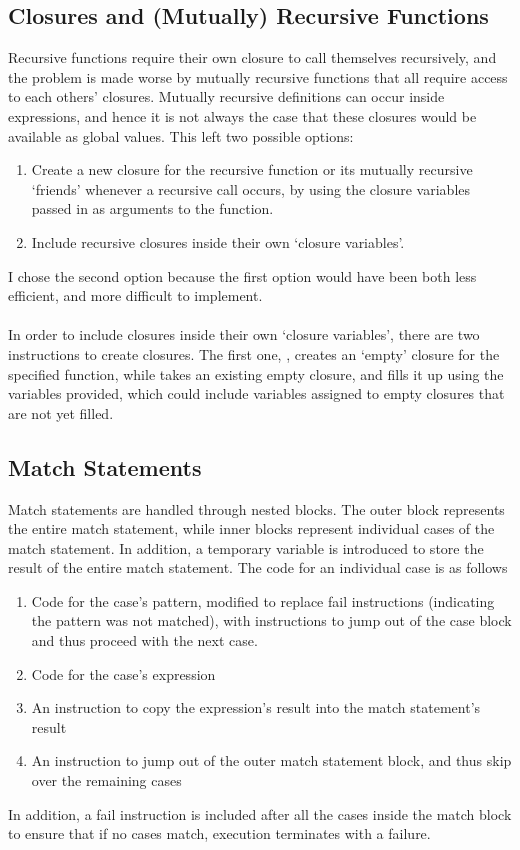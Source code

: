 \subsection{Closures and (Mutually) Recursive Functions}
Recursive functions require their own closure to call themselves recursively, and the problem is made worse by mutually recursive functions that all require access to each others' closures. Mutually recursive definitions can occur inside expressions, and hence it is not always the case that these closures would be available as global values. This left two possible options:
\begin{enumerate}
\item Create a new closure for the recursive function or its mutually recursive `friends' whenever a recursive call occurs, by using the closure variables passed in as arguments to the function.
\item Include recursive closures inside their own `closure variables'.
\end{enumerate}
I chose the second option because the first option would have been both less efficient, and more difficult to implement.
\\\\
In order to include closures inside their own `closure variables', there are two instructions to create closures. The first one, , creates an `empty' closure for the specified function, while  takes an existing empty closure, and fills it up using the variables provided, which could include variables assigned to empty closures that are not yet filled.

\subsection{Match Statements}
Match statements are handled through nested blocks. The outer block represents the entire match statement, while inner blocks represent individual cases of the match statement. In addition, a temporary variable is introduced to store the result of the entire match statement. The code for an individual case is as follows
\begin{enumerate}
\item Code for the case's pattern, modified to replace fail instructions (indicating the pattern was not matched), with instructions to jump out of the case block and thus proceed with the next case.
\item Code for the case's expression
\item An instruction to copy the expression's result into the match statement's result
\item An instruction to jump out of the outer match statement block, and thus skip over the remaining cases
\end{enumerate}
In addition, a fail instruction is included after all the cases inside the match block to ensure that if no cases match, execution terminates with a failure.

